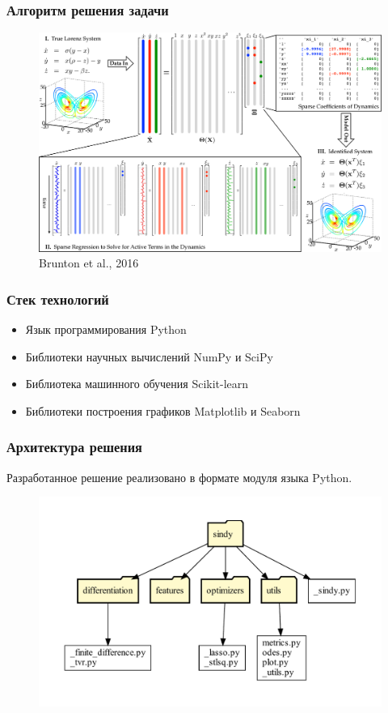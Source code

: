\documentclass[pdf, hyperref={unicode}, aspectratio=169]{beamer}
\begin{document}
\begin{frame}
\frametitle{Алгоритм решения задачи}

\begin{figure}
\includegraphics[height=0.78\textheight]{img/sindy_scheme}
\caption{\scriptsize\hfill Brunton et al., 2016}
\end{figure}
\end{frame}


\begin{frame}
\frametitle{Стек технологий}

\begin{itemize}
  \item Язык программирования Python
  \item Библиотеки научных вычислений NumPy и SciPy
  \item Библиотека машинного обучения Scikit-learn
  \item Библиотеки построения графиков Matplotlib и Seaborn
\end{itemize}
\end{frame}


\begin{frame}
\frametitle{Архитектура решения}

Разработанное решение реализовано в формате модуля языка Python.
\begin{figure}
\includegraphics[height=0.8\textheight]{img/tree}
\end{figure}
\end{frame}
\end{document}
